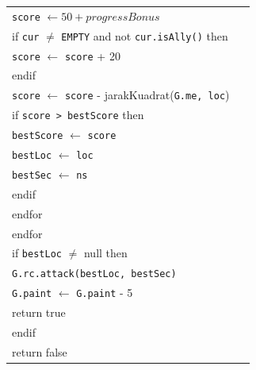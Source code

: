 \documentclass{article}
\newenvironment{pseudobox}
{
\centering
\begin{longtable}{|p{0.94\linewidth}|}
\hline
}
{
\\ \hline
\end{longtable}
\vspace{0.05cm}
}
\begin{document}
\begin{enumerate}[label=\alph*.]
\begin{enumerate}[label=\alph*.]
\begin{pseudobox}
\hspace*{4.5em}\texttt{score} $\leftarrow 50 + progressBonus$ \\

\hspace*{4.5em}if \texttt{cur} $\neq$ \texttt{EMPTY} and not \texttt{cur.isAlly()} then \\
\hspace*{6em}\texttt{score} $\leftarrow$ \texttt{score} + 20 \\
\hspace*{4.5em}endif \\

\hspace*{4.5em}\texttt{score} $\leftarrow$ \texttt{score} - jarakKuadrat(\texttt{G.me, loc}) \\

\hspace*{4.5em}if \texttt{score > bestScore} then \\
\hspace*{6em}\texttt{bestScore} $\leftarrow$ \texttt{score} \\
\hspace*{6em}\texttt{bestLoc} $\leftarrow$ \texttt{loc} \\
\hspace*{6em}\texttt{bestSec} $\leftarrow$ \texttt{ns} \\
\hspace*{4.5em}endif \\
\hspace*{3em}endfor \\
\hspace*{1.5em}endfor \\

\hspace*{1.5em}if \texttt{bestLoc} $\neq$ null then \\
\hspace*{3em}\texttt{G.rc.attack(bestLoc, bestSec)} \\
\hspace*{3em}\texttt{G.paint} $\leftarrow$ \texttt{G.paint} - 5 \\
\hspace*{3em}return true \\
\hspace*{1.5em}endif \\

\hspace*{1.5em}return false
\end{pseudobox}


\end{enumerate}
\end{enumerate}
\end{document}
